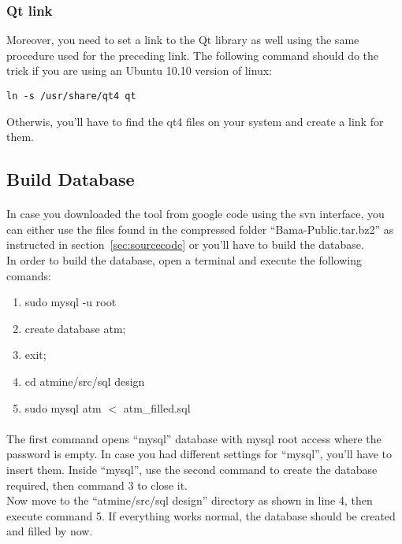 \documentclass{article}
\begin{document}
\subsubsection{Qt link}
Moreover, you need to set a link to the Qt library as well using the same procedure used for the preceding link. 
The following command should do the trick if you are using an Ubuntu 10.10 version of linux:
\begin{verbatim}
ln -s /usr/share/qt4 qt
\end{verbatim}
Otherwis, you'll have to find the qt4 files on your system and create a link for them.

\subsection{Build Database}

\paragraph{}
In case you downloaded the tool from google code using the svn interface, you can either use the files found in the compressed folder ``Bama-Public.tar.bz2'' as instructed in section~\ref{sec:sourcecode} or you'll have to build the database.\\
In order to build the database, open a terminal and execute the following comands:

\begin{enumerate}
\item sudo mysql -u root
\item create database atm;
\item exit;
\item cd atmine/src/sql design
\item sudo mysql atm $<$ atm\_filled.sql
\end{enumerate}

\paragraph{}
The first command opens ``mysql'' database with mysql root access where the password is empty. In case you had different settings for ``mysql'', you'll have to insert them. Inside ``mysql'', use the second command to create the database required, then command 3 to close it.\\
Now move to the ``atmine/src/sql design'' directory as shown in line 4, then execute command 5. If everything works normal, the database should be created and filled by now.
\end{document}
